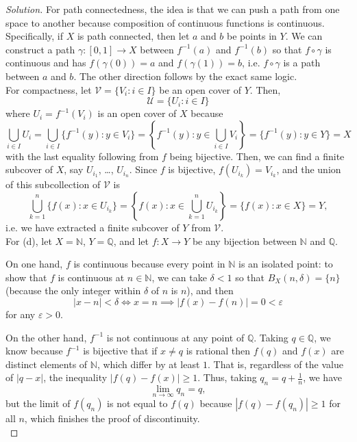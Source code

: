 \documentclass[11pt]{scrartcl}
\providecommand{\eps}{\varepsilon}
\providecommand{\NN}{\mathbb N}
\providecommand{\QQ}{\mathbb Q}
\providecommand{\inv}{^{-1}}
\newenvironment{soln}{\begin{proof}[Solution]}{\end{proof}}
\begin{document}
\begin{soln}
	For path connectedness, the idea is that
	we can push a path from one space to another
	because composition of continuous functions is continuous.
	Specifically, if $X$ is path connected, then let $a$ and $b$
	be points in $Y$. We can construct a path $\gamma\colon[0,1]\to X$
	between $f\inv(a)$ and $f\inv(b)$ so that $f\circ\gamma$
	is continuous and has $f(\gamma(0)) = a$ and $f(\gamma(1)) = b$,
	i.e. $f\circ\gamma$ is a path between $a$ and $b$.
	The other direction follows by the exact same logic.\\
	
	For compactness, let $\mathcal V = \{V_i : i\in I\}$
	be an open cover of $Y$. Then,
	\[\mathcal U = \{U_i : i\in I\}\]
	where $U_i = f\inv(V_i)$ is an open cover of $X$ because
	\[\bigcup_{i\in I} U_i =
	\bigcup_{i\in I} \{f\inv(y) : y\in V_i\} =
	\left\{f\inv(y) : y\in\bigcup_{i\in I} V_i\right\} =
	\{f\inv(y) : y\in Y\} = X\]
	with the last equality following from $f$ being bijective.
	Then, we can find a finite subcover of $X$, say
	$U_{i_1}$, \dots, $U_{i_n}$. Since $f$ is bijective,
	$f(U_{i_k}) = V_{i_k}$, and the union of this
	subcollection of $\mathcal V$ is
	\[\bigcup_{k=1}^n \{f(x) : x\in U_{i_k}\} =
	\left\{f(x) : x\in \bigcup_{k=1}^n U_{i_k}\right\} =
	\{f(x) : x\in X\} = Y,\]
	i.e. we have extracted a finite subcover of $Y$
	from $\mathcal V$.\\

	For (d), let $X = \NN$, $Y = \QQ$, and let $f\colon X\to Y$
	be any bijection between $\NN$ and $\QQ$.
	
	On one hand, $f$ is continuous because every point in $\NN$
	is an isolated point: to show that $f$ is continuous at
	$n\in\NN$, we can take $\delta < 1$ so that $B_X(n,\delta) = \{n\}$
	(because the only integer within $\delta$ of $n$ is $n$), and then
	\[|x - n| < \delta \iff x = n \implies |f(x) - f(n)| = 0 < \eps\]
	for any $\eps > 0$.
	
	On the other hand, $f\inv$ is not continuous at any point of $\QQ$.
	Taking $q\in\QQ$, we know because $f\inv$ is bijective that
	if $x\ne q$ is rational then $f(q)$ and $f(x)$
	are distinct elements of $\NN$, which differ by at least $1$.
	That is, regardless of the value of $|q - x|$,
	the inequality $|f(q) - f(x)| \ge 1$.
	Thus, taking $q_n = q + \frac 1n$, we have
	\[\lim_{n\to\infty} q_n = q,\]
	but the limit of $f(q_n)$ is not equal to $f(q)$ because
	$|f(q) - f(q_n)| \ge 1$ for all $n$,
	which finishes the proof of discontinuity.\\
	

\end{soln}
\end{document}
